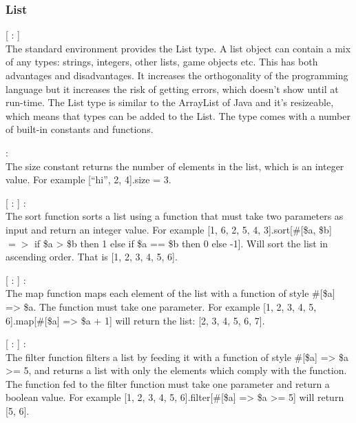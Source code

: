 \subsubsection{List}

\begin{dlist}
  \item {}[ : ]\\
  The standard environment provides the List type. A list object can contain a mix of any types: strings, integers, other lists, game objects etc.
  This has both advantages and disadvantages. It increases the orthogonality of the programming language but it increases the risk of getting
  errors, which doesn't show until at run-time. The List type is similar to the ArrayList of Java and it's resizeable, which means that types can be added to the List. The type comes with a number of built-in constants and functions. 
  \item {} : \\
  The size constant returns the number of elements in the list, which is an integer value. For example [``hi'', 2, 4].size = 3.
  \item {}[ : ] :  \\
  The sort function sorts a list using a function that must take two parameters as input and return an integer value. For example [1, 6, 2, 5, 4, 3].sort[\#[\$a, \$b] $=>$ if \$a > \$b then 1 else if \$a == \$b then 0 else -1]. Will sort the list in ascending order. That is [1, 2, 3, 4, 5, 6].
  \item {}[ : ] :  \\
  The map function maps each element of the list with a function of style \#[\$a] => \$a. The function must take one parameter. For example [1, 2, 3, 4, 5, 6].map[\#[\$a] => \$a + 1] will return the list: [2, 3, 4, 5, 6, 7].
  \item {}[ : ] :  \\
  The filter function filters a list by feeding it with a function of style \#[\$a] => \$a >= 5, and returns a list with only the elements which comply with the function. The function fed to the filter function must take one parameter and return a boolean value. For example [1, 2, 3, 4, 5, 6].filter[\#[\$a] => \$a >= 5] will return [5, 6]. 
\end{dlist}

